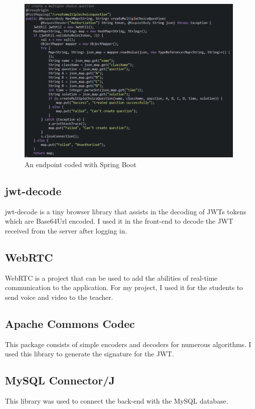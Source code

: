 \documentclass[a4paper, 11pt,openany]{book} %
\begin{document}
\begin{figure}[H]
    \centering
    \includegraphics[width=\textwidth,height=\textheight,keepaspectratio]{images/springboot.png}
    \caption{An endpoint coded with Spring Boot}
\end{figure}

\subsection{jwt-decode}
jwt-decode is a tiny browser library that assists in the decoding of JWTs tokens which are Base64Url encoded.\cite{jwtdecode} I used it in the front-end to decode the JWT received from the server after logging in.

\subsection{WebRTC}
WebRTC is a project that can be used to add the abilities of real-time communication to the application.\cite{webrtc} For my project, I used it for the students to send voice and video to the teacher.

\subsection{Apache Commons Codec}
This package consists of simple encoders and decoders for numerous algorithms.\cite{codec} I used this library to generate the signature for the JWT.

\subsection{MySQL Connector/J}
This library was used to connect the back-end with the MySQL database.
\end{document}
